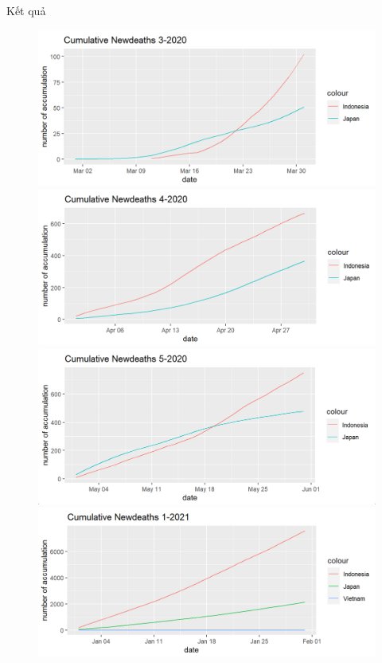 \documentclass[a4paper]{article}
\theoremstyle{definition}
\begin{document}
\begin{enumerate}[1)]
	Kết quả
	\begin{figure}[H]
	    \begin{center}
            \includegraphics[scale=0.5]{vi/cml_nd_3_2020}
    		\includegraphics[scale=0.5]{vi/cml_nd_4_2020}
    		\includegraphics[scale=0.5]{vi/cml_nd_5_2020}
    		\includegraphics[scale=0.5]{vi/cml_nd_1_2021}
	    \end{center}
	\end{figure}
	

\end{enumerate}
\end{document}
